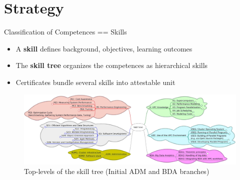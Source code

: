 \documentclass[compress,aspectratio=169]{beamer}
\begin{document}
\section{Strategy}
\sectionIntroHidden

\begin{frame}{Classification of Competences == Skills}
	\begin{itemize}
		\item A \textbf{skill} defines background, objectives, learning outcomes
		\item The \textbf{skill tree} organizes the competences as hierarchical skills
		\item Certificates bundle several skills into attestable unit
	\end{itemize}

	\begin{figure}
		\includegraphics[width=\textwidth]{skill-tree}
		\vspace*{-2em}
		\caption{Top-levels of the skill tree (Initial ADM and BDA branches)}
	\end{figure}
\end{frame}
\end{document}
